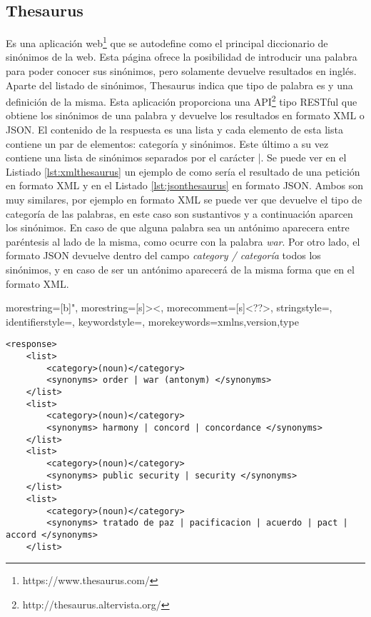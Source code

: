 \subsection{Thesaurus}
\label{cap:subsec:thesaurus}
Es una aplicación web\footnote{https://www.thesaurus.com/} que se autodefine como el principal diccionario de sinónimos de la web. Esta página ofrece la posibilidad de introducir una palabra para poder conocer sus sinónimos, pero solamente devuelve resultados en inglés. Aparte del listado de sinónimos,  Thesaurus indica que tipo de palabra es y una definición de la misma.
Esta aplicación proporciona una API\footnote{http://thesaurus.altervista.org/} tipo RESTful que obtiene los sinónimos de una palabra y devuelve los resultados en formato XML o JSON. El contenido de la respuesta es una lista y cada elemento de esta lista contiene un par de elementos: categoría y sinónimos. Este último a su vez contiene una lista de sinónimos separados por el carácter |. 
Se puede ver en el Listiado \ref{lst:xmlthesaurus} un ejemplo de como sería el resultado de una petición en formato XML y en el Listado \ref{lst:jsonthesaurus} en formato JSON.
Ambos son muy similares, por ejemplo en formato XML se puede ver que devuelve el tipo de categoría de las palabras, en este caso son sustantivos y a continuación aparcen los sinónimos. En caso de que alguna palabra sea un antónimo aparecera entre paréntesis al lado de la misma, como ocurre con la palabra \textit{war}. Por otro lado, el formato JSON devuelve dentro del campo \textit{category / categoría} todos los sinónimos, y en caso de ser un antónimo aparecerá de la misma forma que en el formato XML.






{
	morestring=[b]",
	morestring=[s]{>}{<},
	morecomment=[s]{<?}{?>},
	stringstyle=\color{black},
	identifierstyle=\color{darkblue},
	keywordstyle=\color{cyan},
	morekeywords={xmlns,version,type}%
}



\lstset{language=XML}
\begin{lstlisting}[caption= Ejemplo de salida de Thesaurus en formato XML, label={lst:xmlthesaurus}, frame=single]
<response> 
	<list>
		<category>(noun)</category> 
		<synonyms> order | war (antonym) </synonyms>
	</list>
	<list>
		<category>(noun)</category> 
		<synonyms> harmony | concord | concordance </synonyms>
	</list>
	<list>
		<category>(noun)</category> 
		<synonyms> public security | security </synonyms>
	</list>
	<list>
		<category>(noun)</category> 
		<synonyms> tratado de paz | pacificacion | acuerdo | pact | accord </synonyms>
	</list>
\end{lstlisting}





